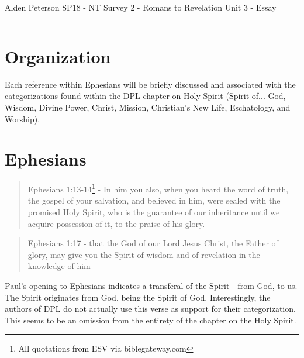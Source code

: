 \documentclass[12pt]{turabian-researchpaper}
\begin{document}
\begin{singlespace}
\noindent Alden Peterson \newline
\noindent SP18 - NT Survey 2 - Romans to Revelation\newline
\noindent Unit 3 - Essay
\newline\noindent\rule{4cm}{0.4pt}
\end{singlespace}




\section{Organization}
Each reference within Ephesians will be briefly discussed and associated with the categorizations found within the DPL chapter on Holy Spirit\autocite[pg404-412]{hawthorne2009dictionary} (Spirit of... God, Wisdom, Divine Power, Christ, Mission, Christian's New Life, Eschatology, and Worship).


\section{Ephesians}



\begin{quote}
Ephesians 1:13-14\footnote{All quotations from ESV via biblegateway.com} -  In him you also, when you heard the word of truth, the gospel of your salvation, and believed in him, were sealed with the promised Holy Spirit, who is the guarantee of our inheritance until we acquire possession of it, to the praise of his glory.
\end{quote}




\begin{quote}
Ephesians 1:17 - that the God of our Lord Jesus Christ, the Father of glory, may give you the Spirit of wisdom and of revelation in the knowledge of him
\end{quote}

\noindent Paul's opening to Ephesians indicates a transferal of the Spirit - from God, to us. The Spirit originates from God, being the Spirit of God. Interestingly, the authors of DPL do not actually use this verse as support for their categorization. This seems to be an omission from the entirety of the chapter on the Holy Spirit.
\end{document}
